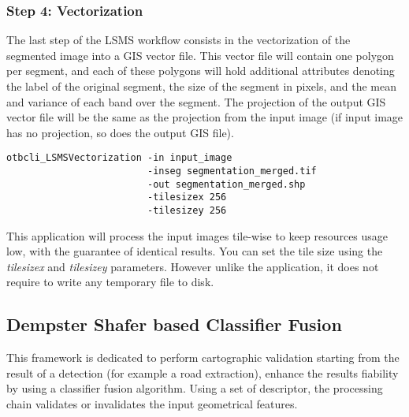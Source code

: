 \subsubsection{Step 4: Vectorization}

The last step of the LSMS workflow consists in the vectorization of the
segmented image into a GIS vector file. This vector file will contain
one polygon per segment, and each of these polygons will hold
additional attributes denoting the label of the original segment, the
size of the segment in pixels, and the mean and variance of each band
over the segment. The projection of the output GIS vector file will be
the same as the projection from the input image (if input image has no
projection, so does the output GIS file).

\begin{verbatim}
otbcli_LSMSVectorization -in input_image 
                         -inseg segmentation_merged.tif 
                         -out segmentation_merged.shp 
                         -tilesizex 256 
                         -tilesizey 256
\end{verbatim}

This application will process the input images tile-wise
to keep resources usage low, with the guarantee of identical
results. You can set the tile size using the \emph{tilesizex} and
\emph{tilesizey} parameters. However unlike the
 application, it does not require to
write any temporary file to disk.

\subsection{Dempster Shafer based Classifier Fusion}\label{ssec:classifierfusion}

This framework is dedicated to perform cartographic validation starting
from the result of a detection (for example a road extraction), enhance
the results fiability by using a classifier fusion algorithm. Using a
set of descriptor, the processing chain validates or invalidates the
input geometrical features.

%

